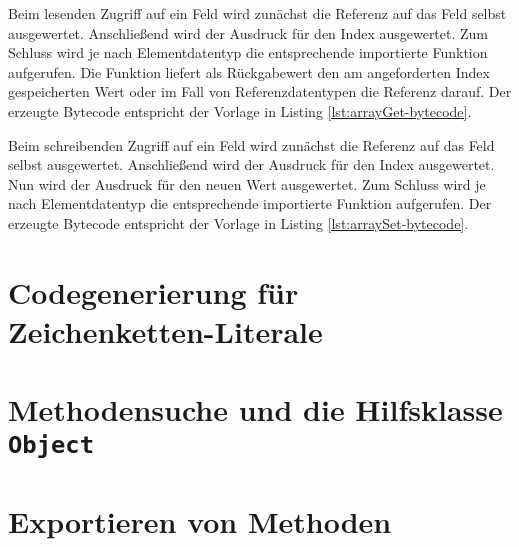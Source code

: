 Beim lesenden Zugriff auf ein Feld wird zunächst die Referenz auf das Feld selbst ausgewertet. Anschließend wird der Ausdruck für den Index ausgewertet. Zum Schluss wird je nach Elementdatentyp die entsprechende importierte Funktion aufgerufen. Die Funktion liefert als Rückgabewert den am angeforderten Index gespeicherten Wert oder im Fall von Referenzdatentypen die Referenz darauf. Der erzeugte Bytecode entspricht der Vorlage in Listing \ref{lst:arrayGet-bytecode}.



Beim schreibenden Zugriff auf ein Feld wird zunächst die Referenz auf das Feld selbst ausgewertet. Anschließend wird der Ausdruck für den Index ausgewertet. Nun wird der Ausdruck für den neuen Wert ausgewertet. Zum Schluss wird je nach Elementdatentyp die entsprechende importierte Funktion aufgerufen. Der erzeugte Bytecode entspricht der Vorlage in Listing \ref{lst:arraySet-bytecode}.



\section{Codegenerierung für Zeichenketten-Literale}

\section{Methodensuche und die Hilfsklasse \lstinline{Object}}

\section{Exportieren von Methoden}
